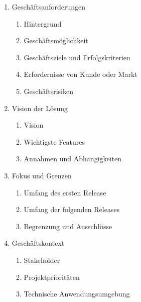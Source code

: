 \begin{tcolorbox}[title=Mögliche Gliederung]
    \begin{enumerate}
        \item Geschäftsanforderungen
        \begin{enumerate}[label*=\arabic*.]
            \item Hintergrund
            \item Geschäftsmöglichkeit
            \item Geschäftsziele und Erfolgskriterien
            \item Erfordernisse von Kunde oder Markt
            \item Geschäftsrisiken
        \end{enumerate}
        \item Vision der Lösung
        \begin{enumerate}[label*=\arabic*.]
            \item Vision
            \item Wichtigste Features
            \item Annahmen und Abhängigkeiten
        \end{enumerate}
        \item Fokus und Grenzen
        \begin{enumerate}[label*=\arabic*.]
            \item Umfang des ersten Release
            \item Umfang der folgenden Releases
            \item Begrenzung und Ausschlüsse
        \end{enumerate}
        \item Geschäftskontext
        \begin{enumerate}[label*=\arabic*.]
            \item Stakeholder
            \item Projektprioritäten
            \item Technische Anwendungsumgebung
        \end{enumerate}
    \end{enumerate}
\end{tcolorbox}